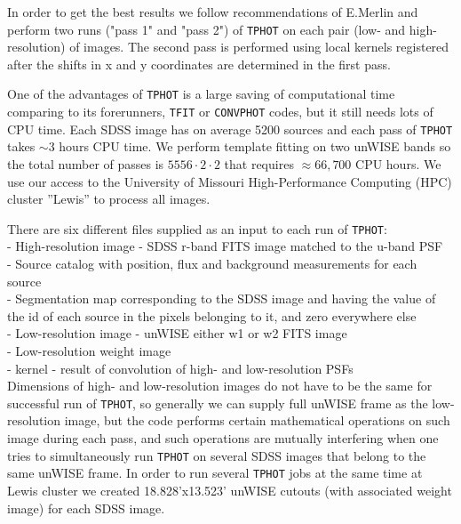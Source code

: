 In order to get the best results we follow recommendations of E.Merlin and perform two runs ("pass 1" and "pass 2") of {\tt TPHOT} on each pair (low- and high-resolution) of images. The second pass is performed using local kernels registered after the shifts in x and y coordinates are determined in the first pass.

One of the advantages of {\tt TPHOT} is a large saving of computational time comparing to its forerunners, {\tt TFIT} or {\tt CONVPHOT} codes, but it still needs lots of CPU time. Each SDSS image has on average 5200 sources and each pass of {\tt TPHOT} takes $\sim3$ hours CPU time. We perform template fitting on two unWISE bands so the total number of passes is $5556 \cdot 2 \cdot 2$ that requires $\approx 66,700$ CPU hours. We use our access to the University of Missouri High-Performance Computing (HPC) cluster ”Lewis” to process all images.

There are six different files supplied as an input to each run of {\tt TPHOT}:\\
-	High-resolution image - SDSS r-band FITS image matched to the u-band PSF\\
-	Source catalog with position, flux and background measurements for each source\\
-	Segmentation map corresponding to the SDSS image and having the value of the id of each source in the pixels belonging to it, and zero everywhere else\\
-	Low-resolution image - unWISE either w1 or w2 FITS image\\
-	Low-resolution weight image\\
-	kernel - result of convolution of high- and low-resolution PSFs\\

Dimensions of high- and low-resolution images do not have to be the same for successful run of {\tt TPHOT}, so generally we can supply full unWISE frame as the low-resolution image, but the code performs certain mathematical operations on such image during each pass, and such operations are mutually interfering when one tries to simultaneously run {\tt TPHOT} on several SDSS images that belong to the same unWISE frame. In order to run several {\tt TPHOT} jobs at the same time at Lewis cluster we created 18.828'x13.523' unWISE cutouts (with associated weight image) for each SDSS image.

